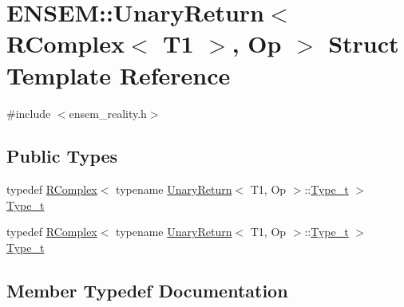 \hypertarget{structENSEM_1_1UnaryReturn_3_01RComplex_3_01T1_01_4_00_01Op_01_4}{}\section{E\+N\+S\+EM\+:\+:Unary\+Return$<$ R\+Complex$<$ T1 $>$, Op $>$ Struct Template Reference}
\label{structENSEM_1_1UnaryReturn_3_01RComplex_3_01T1_01_4_00_01Op_01_4}


{\ttfamily \#include $<$ensem\+\_\+reality.\+h$>$}

\subsection*{Public Types}
\begin{DoxyCompactItemize}
\item 
typedef \mbox{\hyperlink{classENSEM_1_1RComplex}{R\+Complex}}$<$ typename \mbox{\hyperlink{structENSEM_1_1UnaryReturn}{Unary\+Return}}$<$ T1, Op $>$\+::\mbox{\hyperlink{structENSEM_1_1UnaryReturn_3_01RComplex_3_01T1_01_4_00_01Op_01_4_ac02d831030bfab6627f041d352dbbe95}{Type\+\_\+t}} $>$ \mbox{\hyperlink{structENSEM_1_1UnaryReturn_3_01RComplex_3_01T1_01_4_00_01Op_01_4_ac02d831030bfab6627f041d352dbbe95}{Type\+\_\+t}}
\item 
typedef \mbox{\hyperlink{classENSEM_1_1RComplex}{R\+Complex}}$<$ typename \mbox{\hyperlink{structENSEM_1_1UnaryReturn}{Unary\+Return}}$<$ T1, Op $>$\+::\mbox{\hyperlink{structENSEM_1_1UnaryReturn_3_01RComplex_3_01T1_01_4_00_01Op_01_4_ac02d831030bfab6627f041d352dbbe95}{Type\+\_\+t}} $>$ \mbox{\hyperlink{structENSEM_1_1UnaryReturn_3_01RComplex_3_01T1_01_4_00_01Op_01_4_ac02d831030bfab6627f041d352dbbe95}{Type\+\_\+t}}
\end{DoxyCompactItemize}


\subsection{Member Typedef Documentation}
\mbox{\label{structENSEM_1_1UnaryReturn_3_01RComplex_3_01T1_01_4_00_01Op_01_4_ac02d831030bfab6627f041d352dbbe95}} 
